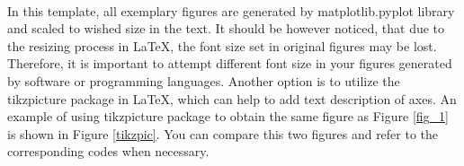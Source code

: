 	\begin{figure}[h!]
		\centering
		 \hspace{1cm}
		 \\
	\end{figure}

	In this template, all exemplary figures are generated by matplotlib.pyplot library and scaled to wished size in the text. It should be however noticed, that due to the resizing process in \LaTeX, the font size set in original figures may be lost. Therefore, it is important to attempt different font size in your figures generated by software or programming languages. Another option is to utilize the {\color{blue}tikzpicture} package in \LaTeX, which can help to add text description of axes. An example of using {\color{blue}tikzpicture} package to obtain the same figure as Figure \ref{fig_1} is shown in Figure \ref{tikzpic}. You can compare this two figures and refer to the corresponding codes when necessary.
	
